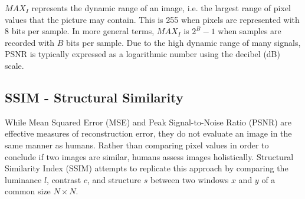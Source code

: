 

$MAX_I$ represents the dynamic range of an image, i.e. the largest range of pixel values that the picture may contain. This is 255 when pixels are represented with 8 bits per sample. In more general terms, $MAX_I$ is $2^B-1$ when samples are recorded with $B$ bits per sample. Due to the high dynamic range of many signals, PSNR is typically expressed as a logarithmic number using the decibel (dB) scale.


\subsection{SSIM - Structural Similarity}
While Mean Squared Error (MSE) and Peak Signal-to-Noise Ratio (PSNR) are effective measures of reconstruction error, they do not evaluate an image in the same manner as humans. Rather than comparing pixel values in order to conclude if two images are similar, humans assess images holistically. Structural Similarity Index (SSIM) attempts to replicate this approach by comparing the luminance $l$, contrast $c$, and structure $s$ between two windows $x$ and $y$ of a common size $N \times N$.




\begin{comment}
\begin{itemize}
    \item $\mu$ represents the pixel sample mean for both $x$ and $y$,
    \item $\sigma^2$ represents the variance for both $x$ and $y$,
    \item $\sigma_{xy}$ represents the covariance of x and y,
    \item $c_1 = (k_1L)^2$, $c_2 = (k_2L)^2$ are variables to stabilize the division with weak denominator,
    \item $L$ represents the dynamic range of the pixel-values,
    \item $k_1 = 0.01$, $k_2 = 0.03$ by default   
\end{itemize}
\end{comment}

